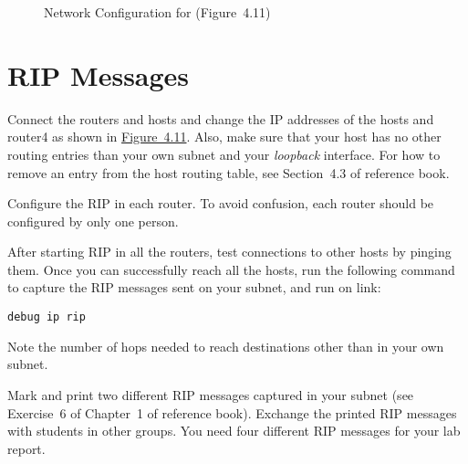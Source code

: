\documentclass{../UTNetLab}
\begin{document}
\begin{figure}[H]
    \caption{Network Configuration for  (Figure~4.11)}\label{fig:4.11}
\end{figure}
\section{RIP Messages}
Connect the routers and hosts and change the IP addresses of the hosts and router4 as shown in \hyperref[fig:4.11]{Figure~4.11}.
Also, make sure that your host has no other routing entries than your own subnet and your \textit{loopback} interface.
For how to remove an entry from the host routing table, see Section~4.3 of reference book.

Configure the RIP in each router.
To avoid confusion, each router should be configured by only one person.

After starting RIP in all the routers, test connections to other hosts by pinging them.
Once you can successfully reach all the hosts, run the following command to capture the RIP messages sent on your subnet, and run  on link:
\begin{lstlisting}[morekeywords={[3]udp,port}]
debug ip rip
    \end{lstlisting}


Note the number of hops needed to reach destinations other than in your own subnet.

Mark and print two different RIP messages captured in your subnet (see Exercise~6 of Chapter~1 of reference book).
Exchange the printed RIP messages with students in other groups.
You need four different RIP messages for your lab report.
\end{document}
